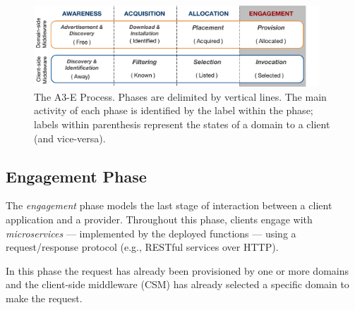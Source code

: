 
\begin{figure}[tbp]
	\includegraphics[width=0.95\textwidth]{figs/A3-E-process}
	\caption{The A3-E Process. Phases are delimited by vertical lines. The main activity of each phase is identified by the label within the phase; labels within parenthesis represent the states of a domain to a client (and vice-versa).}
	\label{fig:A3-E-process}
\end{figure}



\subsection*{Engagement Phase}\label{sec:A3-E-engagement}

The \textit{engagement} phase models the last stage of interaction between a client application and a provider. Throughout this phase, clients engage with \textit{microservices} --- implemented by the deployed functions --- using a request/response protocol (e.g., RESTful services over HTTP). 


In this phase the request has already been provisioned by one or more domains and the client-side middleware (CSM) has already selected a specific domain to make the request. 




